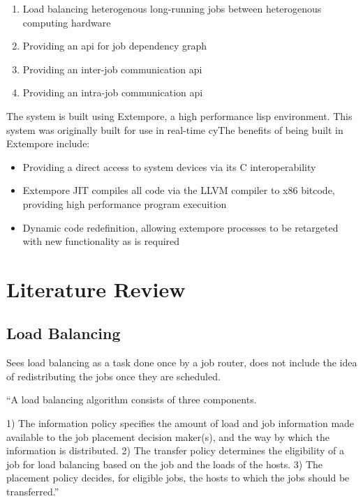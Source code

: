 \documentclass[a4paper,12pt,oldfontcommands]{memoir}
\begin{document}
\begin{enumerate}
\item Load balancing heterogenous long-running jobs between heterogenous computing hardware
\item Providing an api for job dependency graph
\item Providing an inter-job communication api
\item Providing an intra-job communication api
\end{enumerate}

The system is built using Extempore, a high performance lisp environment. This system was originally built for use in real-time cyThe benefits of being built in Extempore include:

\begin{itemize}
\item Providing a direct access to system devices via its C interoperability
\item Extempore \gls{JIT} compiles all code via the LLVM compiler to x86 bitcode, providing high performance program execuition
\item Dynamic code redefinition, allowing extempore processes to be retargeted with new functionality as is required
\end{itemize}

\chapter{Literature Review}

\section{Load Balancing}



Sees load balancing as a task done once by a job router, does not include the idea of redistributing the jobs once they are scheduled.
\cite{1675365}

``A load balancing algorithm consists of three components.

1) The information policy specifies the amount of load
and job information made available to the job placement
decision maker(s), and the way by which the information
is distributed.
2) The transfer policy determines the eligibility of a
job for load balancing based on the job and the loads of
the hosts.
3) The placement policy decides, for eligible jobs, the
hosts to which the jobs should be transferred.''
\cite{6176}
\end{document}
